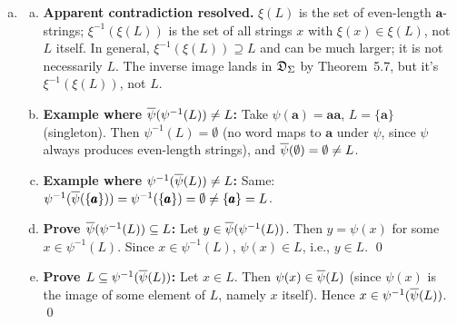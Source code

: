 \begin{enumerate}[{5.}1. ]
\begin{enumerate}[(a)]
\begin{enumerate}[(a)]
  \begin{proof}
  By induction on $|x|$.

  \emph{Base:} $\overline{\delta^\psi}(s,\lambda)=s=\DBAR(s,\lambda)=\DBAR(s,\PBAR(\lambda))$ (since $\psi(\lambda)=\lambda$).

  \emph{Step:} $\overline{\delta^\psi}(s,x\pmb{b})=\delta^\psi(\overline{\delta^\psi}(s,x),\pmb{b})=\deltabar{}(\DBAR(s,\PBAR(x)),\psi(\pmb{b}))=\DBAR(s,\PBAR(x)\psi(\pmb{b}))=\DBAR(s,\PBAR(x\pmb{b}))$. \qed
  \end{proof}

  \item \textbf{Proof of Theorem~5.10:} $y\in L(A^\psi)$ iff $\overline{\delta^\psi}(s_0,y)\in F$ iff $\DBAR(s_0,\psi(y))\in F$ iff $\psi(y)\in L$ iff $y\in\psi^{-1}(L)$. \qed
\end{enumerate}

\item \begin{enumerate}[(a)]
  \item \textbf{Apparent contradiction resolved.}  $\xi(L)$ is the set of even-length $\pmb{a}$-strings; $\xi^{-1}(\xi(L))$ is the set of all strings $x$ with $\xi(x)\in\xi(L)$, not $L$ itself.  In general, $\xi^{-1}(\xi(L))\supseteq L$ and can be much larger; it is not necessarily $L$.  The inverse image lands in $\mathfrak{D}_\Sigma$ by Theorem~5.7, but it's $\xi^{-1}(\xi(L))$, not $L$.

  \item \textbf{Example where $\overline{\psi}(\psi^{-1}(L))\neq L$:} Take $\psi(\pmb{a})=\pmb{a}\pmb{a}$, $L=\{\pmb{a}\}$ (singleton).  Then $\psi^{-1}(L)=\emptyset$ (no word maps to $\pmb{a}$ under $\psi$, since $\psi$ always produces even-length strings), and $\overline{\psi}(\emptyset)=\emptyset\neq L$.

  \item \textbf{Example where $\psi^{-1}(\overline{\psi}(L))\neq L$:} Same: $\psi^{-1}(\overline{\psi}(\{\pmb{a}\}))=\psi^{-1}(\{\pmb{a}\})=\emptyset\neq\{\pmb{a}\}=L$.

  \item \textbf{Prove $\overline{\psi}(\psi^{-1}(L))\subseteq L$:} Let $y\in\overline{\psi}(\psi^{-1}(L))$.  Then $y=\psi(x)$ for some $x\in\psi^{-1}(L)$.  Since $x\in\psi^{-1}(L)$, $\psi(x)\in L$, i.e., $y\in L$. \qed

  \item \textbf{Prove $L\subseteq\psi^{-1}(\overline{\psi}(L))$:} Let $x\in L$.  Then $\psi(x)\in\overline{\psi}(L)$ (since $\psi(x)$ is the image of some element of $L$, namely $x$ itself).  Hence $x\in\psi^{-1}(\overline{\psi}(L))$. \qed
\end{enumerate}


\end{enumerate}
\end{enumerate}
